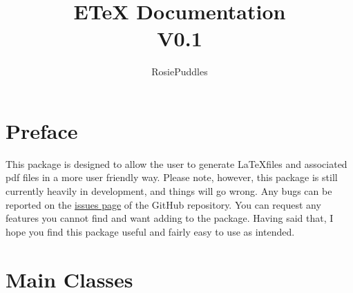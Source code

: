 \documentclass{article}
\title{ETeX Documentation\\\large V0.1}
\date{}
\author{RosiePuddles}
\begin{document}
\maketitle
\tableofcontents
\newpage
\section[Preface]{Preface}
This package is designed to allow the user to generate \LaTeX  files and associated pdf files in a more user friendly way. Please note, however, this package is still currently heavily in development, and things will go wrong. Any bugs can be reported on the \href{https:/github.comRosiePuddlesETeX_from_pythonissues}{issues page} of the GitHub repository. You can request any features you cannot find and want adding to the package. Having said that, I hope you find this package useful and fairly easy to use as intended.\section[Main Classes]{Main Classes}
\end{document}
